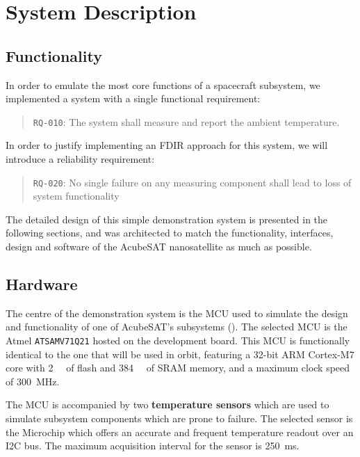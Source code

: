 \documentclass[a4paper,nobib]{tufte-book}
\begin{document}
\section{System Description}

\subsection{Functionality}
\label{sec:tsvcd}

In order to emulate the most core functions of a spacecraft subsystem, we implemented a system with a single functional requirement:
\begin{quote}
	\texttt{RQ-010}: The system shall measure and report the ambient temperature.
\end{quote}

In order to justify implementing an \ac{FDIR} approach for this system, we will introduce a reliability requirement:
\begin{quote}
	\texttt{RQ-020}: No single failure on any measuring component shall lead to loss of system functionality
\end{quote}

The detailed design of this simple demonstration system is presented in the following sections, and was architected to match the functionality, interfaces, design and software of the AcubeSAT nanosatellite as much as possible.

\subsection{Hardware}

The centre of the demonstration system is the \ac{MCU} used to simulate the design and functionality of one of AcubeSAT's subsystems (). The selected \ac{MCU} is the Atmel \texttt{ATSAMV71Q21} hosted on the  development board. This \ac{MCU} is functionally identical to the one that will be used in orbit, featuring a 32-bit ARM Cortex-M7 core with \SI{2}{\mebi\byte} of flash and \SI{384}{\kibi\byte} of \acs{SRAM} memory, and a maximum clock speed of \SI{300}{\mega\hertz}.

The \ac{MCU} is accompanied by two \textbf{temperature sensors} which are used to simulate subsystem components which are prone to failure. The selected sensor is the Microchip  which offers an accurate and frequent temperature readout over an \ac{I2C} bus. The maximum acquisition interval for the sensor is \SI{250}{\milli\second}.
\end{document}
